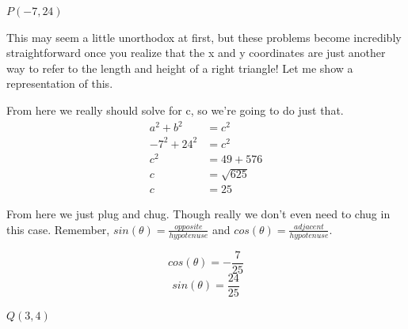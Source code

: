 \documentclass[10pt,letterpaper]{amspset}
\begin{document}
\begin{problem}[65.]
$P(-7, 24)$
\end{problem}

\begin{solution}[Solution]
This may seem a little unorthodox at first, but these problems become incredibly straightforward once you realize that the x and y coordinates are just another way to refer to the length and height of a right triangle! Let me show a representation of this.


From here we really should solve for c, so we're going to do just that.
\begin{align}
    a^2 + b^2 &= c^2 \\
    -7^2 + 24^2 &= c^2 \\
    c^2 &= 49 + 576 \\
    c &= \sqrt{625} \\
    c &= 25
\end{align}

From here we just plug and chug. Though really we don't even need to chug in this case. Remember, $sin(\theta) = \frac{opposite}{hypotenuse}$ and $cos(\theta) = \frac{adjacent}{hypotenuse}$.

\[\boxed{cos(\theta) = - \frac{7}{25}}\]
\[\boxed{sin(\theta) = \frac{24}{25}}\]

\end{solution}


\pagebreak


\begin{problem}[66.]
$Q(3, 4)$
\end{problem}
\end{document}
